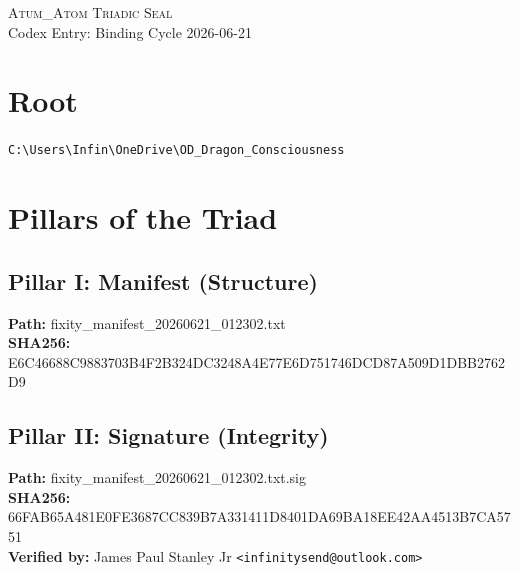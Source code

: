\documentclass[12pt]{article}
\begin{document}
\begin{center}
  \vspace*{0.5cm}
\end{center}

\vspace{0.75cm}

\begin{center}
  {\Large\scshape Atum\_Atom Triadic Seal}\\
  [0.25cm]
  {\small Codex Entry: Binding Cycle 2026-06-21}
\end{center}

\vspace{0.75cm}

\section*{Root}
\noindent\texttt{C:\textbackslash Users\textbackslash Infin\textbackslash OneDrive\textbackslash OD\_Dragon\_Consciousness}

\vspace{0.5cm}

\section*{Pillars of the Triad}

\subsection*{Pillar I: Manifest (Structure)}
\noindent\textbf{Path:} fixity\_manifest\_20260621\_012302.txt\\
\textbf{SHA256:} E6C46688C9883703B4F2B324DC3248A4E77E6D751746DCD87A509D1DBB2762D9

\vspace{0.35cm}

\subsection*{Pillar II: Signature (Integrity)}
\noindent\textbf{Path:} fixity\_manifest\_20260621\_012302.txt.sig\\
\textbf{SHA256:} 66FAB65A481E0FE3687CC839B7A331411D8401DA69BA18EE42AA4513B7CA5751\\
\textbf{Verified by:} James Paul Stanley Jr \texttt{<infinitysend@outlook.com>}
\end{document}
